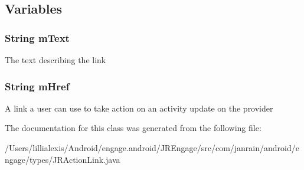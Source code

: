 \subsection{Variables}
\hypertarget{classcom_1_1janrain_1_1android_1_1engage_1_1types_1_1_j_r_action_link_ad286627be2e2470bd7f917c103faecbf}{
\subsubsection[{mText}]{\setlength{\rightskip}{0pt plus 5cm}String {\bf mText}}}
\label{classcom_1_1janrain_1_1android_1_1engage_1_1types_1_1_j_r_action_link_ad286627be2e2470bd7f917c103faecbf}
The text describing the link \hypertarget{classcom_1_1janrain_1_1android_1_1engage_1_1types_1_1_j_r_action_link_a9207c3b8ef8469f1d9101379d48550ce}{
\subsubsection[{mHref}]{\setlength{\rightskip}{0pt plus 5cm}String {\bf mHref}}}
\label{classcom_1_1janrain_1_1android_1_1engage_1_1types_1_1_j_r_action_link_a9207c3b8ef8469f1d9101379d48550ce}
A link a user can use to take action on an activity update on the provider 

The documentation for this class was generated from the following file:\begin{DoxyCompactItemize}
\item 
/Users/lillialexis/Android/engage.android/JREngage/src/com/janrain/android/engage/types/JRActionLink.java\end{DoxyCompactItemize}
